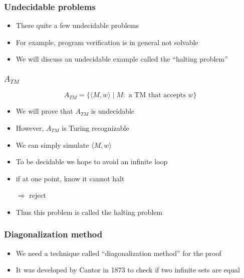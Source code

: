 




\begin{frame}[allowframebreaks] \frametitle{Undecidable problems}
  \begin{itemize}
\item There quite a few undecidable problems

\item For example, program verification is in general not solvable

\item We will discuss an undecidable example called the ``halting problem''
  
\end{itemize}\end{frame} \begin{frame}[allowframebreaks] \frametitle{$A_{TM}$}
\begin{equation*}
  A_{TM}=\{
\langle  M,w\rangle \mid M: \mbox{ a TM that accepts } w\}
\end{equation*}
  \begin{itemize}
\item We will prove that $A_{TM}$ is undecidable
\item However, $A_{TM}$ is Turing recognizable

\item We can simply simulate $\langle  M,w\rangle $
\item To be decidable we hope to avoid an infinite loop

\item [] if at one point, know it cannot halt

$\Rightarrow$ reject
\item Thus this problem is called the halting problem
\end{itemize}\end{frame} \begin{frame}[allowframebreaks] \frametitle{Diagonalization method}
  \begin{itemize}
\item We need a technique called ``diagonalization method'' for the proof
\item It was developed by Cantor  in 1873
to check if two  infinite sets are equal


\end{itemize}
\end{frame}

